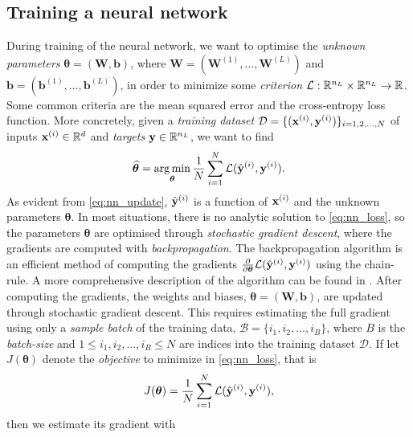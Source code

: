 \documentclass{statsmsc}
\begin{document}
{\subsection{Training a neural network}%
\label{sub:Training a neural network}

During training of the neural network, we want to optimise the \textit{unknown
parameters} $\bm{\theta}=(\mathbf{W}, \mathbf{b})$, where
$\mathbf{W}=\left(\boldsymbol{W}^{(1)},\dots,\boldsymbol{W}^{(L)}\right)$ and
$\mathbf{b}=\left(\boldsymbol{b}^{(1)},\dots,\boldsymbol{b}^{(L)}\right)$, in
order to minimize some \textit{criterion} $\mathcal{L}: \mathbb{R}^{n_L} \times \mathbb{R}^{n_L}
\rightarrow {\mathbb{R}}$. Some common criteria are the mean squared error and the
cross-entropy loss function.
More concretely, given a \textit{training dataset }
$\mathcal{D}=\{(\mathbf{x}^{(i)}, \mathbf{y}^{(i)})\}_{i=1,2,\dots,N}$ of inputs
$\mathbf{x}^{(i)} \in \mathbb{R}^d$ and \textit{targets} $\mathbf{y} \in \mathbb{R}^{n_L}$, we want to find
\begin{equation}\label{eq:nn_loss}
    \widehat{\bm\theta}= \operatorname*{arg\,min}_{\bm\theta}
    \frac{1}{N}  \sum^{N}_{i=1} \mathcal{L}(\hat{\mathbf{y}}^{(i)}, \mathbf{y}^{(i)}).
\end{equation}
As evident from \cref{eq:nn_update}, $\hat{\mathbf{y}}^{(i)}$ is a function of
$\mathbf{x}^{(i)}$ and the unknown parameters $\bm\theta$.
In most situations, there is no analytic solution to \cref{eq:nn_loss}, so
the parameters $\bm\theta$ are optimised through \textit{stochastic gradient descent},
where the gradients are computed with \textit{backpropagation}.
The backpropagation algorithm is an efficient method of computing the gradients
$\frac{\partial }{\partial \bm\theta} \mathcal{L}(\hat{\mathbf{y}}^{(i)}, \mathbf{y}^{(i)}) $
using the chain-rule. A more comprehensive description of the algorithm can be
found in \cite{backprop}.
After computing the gradients, the weights and biases, $\bm\theta=(\mathbf{W},\mathbf{b})$, are updated through
stochastic gradient descent. This requires estimating
the full gradient using only a \textit{sample batch} of the training data,
$\mathcal{B}=\{i_1,i_2,\dots,i_B\}$, where $B$ is the \textit{batch-size} and
$1\leq i_1,i_2,\dots,i_B \leq N$ are indices into the training dataset $\mathcal{D}$.
If let $J(\bm\theta)$ denote the \textit{objective} to minimize in \cref{eq:nn_loss}, that is
\begin{equation}
    J(\bm\theta)=\frac{1}{N} \sum^{N}_{i=1} \mathcal{L}(\hat{\mathbf{y}}^{(i)}, {\mathbf{y}}^{(i)}),
\end{equation}
then we estimate its gradient with
\begin{equation}

\end{equation}}
\end{document}

